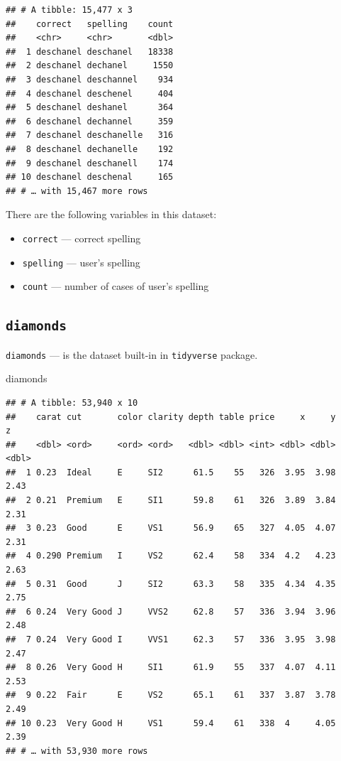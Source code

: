 \documentclass[
]{book}
\newenvironment{Shaded}{\begin{snugshade}}{\end{snugshade}}
\newcommand{\NormalTok}[1]{#1}
\providecommand{\tightlist}{%
  \setlength{\itemsep}{0pt}\setlength{\parskip}{0pt}}
\begin{document}
\begin{verbatim}
## # A tibble: 15,477 x 3
##    correct   spelling    count
##    <chr>     <chr>       <dbl>
##  1 deschanel deschanel   18338
##  2 deschanel dechanel     1550
##  3 deschanel deschannel    934
##  4 deschanel deschenel     404
##  5 deschanel deshanel      364
##  6 deschanel dechannel     359
##  7 deschanel deschanelle   316
##  8 deschanel dechanelle    192
##  9 deschanel deschanell    174
## 10 deschanel deschenal     165
## # … with 15,467 more rows
\end{verbatim}

There are the following variables in this dataset:

\begin{itemize}
\tightlist
\item
  \texttt{correct} --- correct spelling
\item
  \texttt{spelling} --- user's spelling
\item
  \texttt{count} --- number of cases of user's spelling
\end{itemize}

\hypertarget{diamonds}{%
\subsection{\texorpdfstring{\texttt{diamonds}}{diamonds}}\label{diamonds}}

\texttt{diamonds} --- is the dataset built-in in \texttt{tidyverse} package.

\begin{Shaded}
\begin{Highlighting}[]
\NormalTok{diamonds}
\end{Highlighting}
\end{Shaded}

\begin{verbatim}
## # A tibble: 53,940 x 10
##    carat cut       color clarity depth table price     x     y     z
##    <dbl> <ord>     <ord> <ord>   <dbl> <dbl> <int> <dbl> <dbl> <dbl>
##  1 0.23  Ideal     E     SI2      61.5    55   326  3.95  3.98  2.43
##  2 0.21  Premium   E     SI1      59.8    61   326  3.89  3.84  2.31
##  3 0.23  Good      E     VS1      56.9    65   327  4.05  4.07  2.31
##  4 0.290 Premium   I     VS2      62.4    58   334  4.2   4.23  2.63
##  5 0.31  Good      J     SI2      63.3    58   335  4.34  4.35  2.75
##  6 0.24  Very Good J     VVS2     62.8    57   336  3.94  3.96  2.48
##  7 0.24  Very Good I     VVS1     62.3    57   336  3.95  3.98  2.47
##  8 0.26  Very Good H     SI1      61.9    55   337  4.07  4.11  2.53
##  9 0.22  Fair      E     VS2      65.1    61   337  3.87  3.78  2.49
## 10 0.23  Very Good H     VS1      59.4    61   338  4     4.05  2.39
## # … with 53,930 more rows
\end{verbatim}
\end{document}
